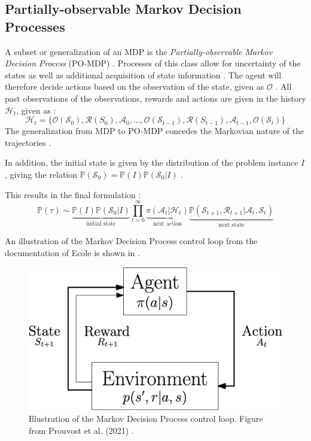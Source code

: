 \subsection{Partially-observable Markov Decision Processes}

A subset or generalization of an \gls{MDP} is the \textit{Partially-observable Markov Decision Process }(\gls{PO-MDP}) \cite{monahan1982state}. Processes of this class allow for uncertainty of the states as well as additional acquisition of state information \cite{monahan1982state}. The agent will therefore decide actions based on the observation of the state, given as $\mathcal{O}$ \cite{prouvost2021ecole}. All past observations of the observations, rewards and actions are given in the history $\mathcal{H}_t$, given as \cite{prouvost2021ecole}:
\begin{equation}
    \mathcal{H}_t = \{\mathcal{O}(\mathcal{S}_0), \mathcal{R}(S_0), \mathcal{A}_0, ..., \mathcal{O}(\mathcal{S}_{t-1}), \mathcal{R}(S_{t-1}), \mathcal{A}_{t-1}, \mathcal{O}(\mathcal{S}_t)\}
\end{equation}
The generalization from \gls{MDP} to \gls{PO-MDP} concedes the Markovian nature of the trajectories \cite{prouvost2020ecole}.

In addition, the initial state is given by the distribution of the problem instance $I$, giving the relation $\mathbb{P}(\mathcal{S}_0) = \mathbb{P}(I) \mathbb{P}(\mathcal{S}_0 | I)  $ \cite{prouvost2021ecole}. 

This results in the final formulation \cite{prouvost2021ecole}:
\begin{equation}
    \mathbb{P}(\tau) \sim \underbrace{ \mathbb{P}(I) \mathbb{P}(\mathcal{S}_0 | I)  }_{\text{initial state}}
\prod_{t=0}^\infty \underbrace{\pi(\mathcal{A}_t | \mathcal{H}_t)}_{\text{next action}}
\underbrace{\mathbb{P}(\mathcal{S}_{t+1}, \mathcal{R}_{t+1} | \mathcal{A}_t, \mathcal{S}_t)}_{\text{next state}}
\end{equation}

An illustration of the Markov Decision Process control loop from the documentation of \gls{Ecole} is shown in .

\begin{figure}
    \centering
    \includegraphics[width=0.55\linewidth]{img/mdp.png}
    \caption{Illustration of the Markov Decision Process control loop. Figure from Prouvost et al. (2021) \cite{prouvost2021ecole}.}
    \label{fig:mdp}
\end{figure}



